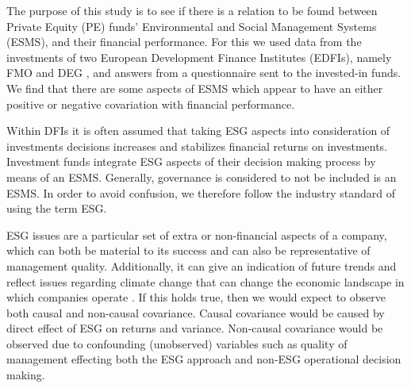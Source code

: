 \documentclass[twoside,12pt]{report}
\let\oldmarginpar\marginpar
\renewcommand\marginpar[1]{\-\oldmarginpar[\raggedleft\footnotesize #1]
{\raggedright\footnotesize #1}}
\begin{document}
\marginpar{purpose} The purpose of this study is to see if there is a relation to be found between Private Equity (PE) funds' Environmental and Social Management Systems (ESMS), and their financial performance. For this we used data from the investments of two European Development Finance Institutes (EDFIs), namely FMO  and DEG , and answers from a questionnaire sent to the invested-in funds. We find that there are some aspects of ESMS which appear to have an either positive or negative covariation with financial performance.

\marginpar{background} Within DFIs it is often assumed that taking ESG aspects into consideration of investments decisions increases and stabilizes financial returns on investments. Investment funds integrate ESG aspects of their decision making process by means of an ESMS. Generally, governance is considered to not be included is an ESMS. In order to avoid confusion, we therefore follow the industry standard of using the term ESG.

ESG issues are a particular set of extra or non-financial aspects of a company, which can both be material to its success and can also be representative of management quality. Additionally, it can give an indication of future trends and reflect issues regarding climate change that can change the economic landscape in which companies operate \parencite[cf.][1]{llewellyn2007business}. 
If this holds true, then we would expect to observe both causal and non-causal covariance.
Causal covariance would be caused by direct effect of ESG on returns and variance.
Non-causal covariance would be observed due to confounding (unobserved) variables such as quality of management effecting both the ESG approach and non-ESG operational decision making.
\end{document}
